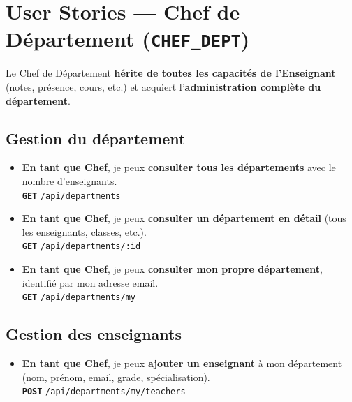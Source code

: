 \documentclass[12pt,a4paper]{article}
\newcommand{\route}[1]{\texorpdfstring{\texttt{\small\color{routeGray}#1}}{#1}}
\newcommand{\httpmethod}[1]{%
  \ifstrequal{#1}{GET}{\colorbox{blue!15}{\texttt{\bfseries\color{blue!70!black}GET}}}{}%
  \ifstrequal{#1}{POST}{\colorbox{green!18}{\texttt{\bfseries\color{green!60!black}POST}}}{}%
  \ifstrequal{#1}{PUT}{\colorbox{orange!18}{\texttt{\bfseries\color{orange!70!black}PUT}}}{}%
  \ifstrequal{#1}{DELETE}{\colorbox{red!15}{\texttt{\bfseries\color{red!70!black}DELETE}}}{}%
}
\newcommand{\usmark}{\color{accentGold}$\blacktriangleright$\;}
\begin{document}
\newpage

\section{User Stories — Chef de Département (\texttt{CHEF\_DEPT})}

\begin{chefbox}

\begin{infobox}[Héritage]
  Le Chef de Département \textbf{hérite de toutes les capacités de l'Enseignant} (notes, présence, cours, etc.) et acquiert l'\textbf{administration complète du département}.
\end{infobox}

\subsection*{Gestion du département}

\begin{itemize}[leftmargin=1.2cm, labelsep=0.4cm]
  \item[\usmark] \textbf{En tant que Chef}, je peux \textbf{consulter tous les départements} avec le nombre d'enseignants.\\
    \httpmethod{GET} \route{/api/departments}

  \item[\usmark] \textbf{En tant que Chef}, je peux \textbf{consulter un département en détail} (tous les enseignants, classes, etc.).\\
    \httpmethod{GET} \route{/api/departments/:id}

  \item[\usmark] \textbf{En tant que Chef}, je peux \textbf{consulter mon propre département}, identifié par mon adresse email.\\
    \httpmethod{GET} \route{/api/departments/my}
\end{itemize}

\subsection*{Gestion des enseignants}

\begin{itemize}[leftmargin=1.2cm, labelsep=0.4cm]
  \item[\usmark] \textbf{En tant que Chef}, je peux \textbf{ajouter un enseignant} à mon département (nom, prénom, email, grade, spécialisation).\\
    \httpmethod{POST} \route{/api/departments/my/teachers}


\end{itemize}
\end{chefbox}
\end{document}
